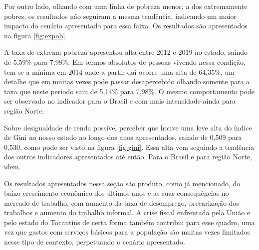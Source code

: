 \par Por outro lado, olhando com uma linha de pobreza menor, a dos extremamente pobres, os resultados não seguiram a mesma tendência, indicando um maior impacto do cenário apresentado para essa faixa. Os resultados são apresentados na figura \ref{fig:expob}.

\par A taxa de extrema pobreza apresentou alta entre 2012 e 2019 no estado, saindo de 5,59\% para 7,98\%. Em termos absolutos de pessoas vivendo nessa condição, tem-se a mínima em 2014 onde a partir daí ocorre uma alta de 64,35\%, um detalhe que em muitas vezes pode passar desapercebido olhando somente para a taxa que neste período saiu de 5,14\% para 7,98\%. O mesmo comportamento pode ser observado no indicador para o Brasil e  com mais intensidade ainda para região Norte.

\par Sobre desigualdade de renda possível perceber que houve uma leve alta do índice de Gini no nosso estado ao longo dos anos apresentados, saindo de 0,509 para 0,530, como pode ser visto na figura \ref{fig:gini}. Essa alta vem seguindo a tendência dos outros indicadores apresentados até então. Para o Brasil e para região Norte, idem.
\par Os resultados apresentados nessa seção são produto, como já mencionado, do baixo crescimento econômico dos últimos anos e as suas consequências no mercado de trabalho, com aumento da taxa de desemprego, precarização dos trabalhos e aumento do trabalho informal. A crise fiscal enfrentada pela União e pelo estado do Tocantins de certa forma também contribui para esse quadro, uma vez que gastos com serviços básicos para a população são muitas vezes limitados nesse tipo de contexto, perpetuando o cenário apresentado.


